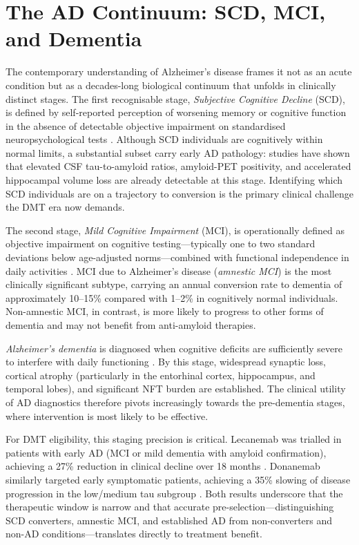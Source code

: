 \documentclass[12pt, a4paper]{report}
\begin{document}
  \section{The AD Continuum: SCD, MCI, and Dementia}
  \label{sec:ad-continuum}

  The contemporary understanding of Alzheimer's disease frames it not as an acute
  condition but as a decades-long biological continuum that unfolds in clinically
  distinct stages. The first recognisable stage, \emph{Subjective Cognitive Decline}
  (SCD), is defined by self-reported perception of worsening memory or cognitive
  function in the absence of detectable objective impairment on standardised
  neuropsychological tests \citep{jessen2014scd}. Although SCD individuals are
  cognitively within normal limits, a substantial subset carry early AD pathology:
  studies have shown that elevated CSF tau-to-amyloid ratios, amyloid-PET positivity,
  and accelerated hippocampal volume loss are already detectable at this stage.
  Identifying which SCD individuals are on a trajectory to conversion is the primary
  clinical challenge the DMT era now demands.

  The second stage, \emph{Mild Cognitive Impairment} (MCI), is operationally defined
  as objective impairment on cognitive testing---typically one to two standard
  deviations below age-adjusted norms---combined with functional independence in daily
  activities \citep{albert2011mci, petersen2004mci}. MCI due to Alzheimer's
  disease (\emph{amnestic MCI}) is the most clinically significant subtype, carrying
  an annual conversion rate to dementia of approximately 10--15\% compared with
  1--2\% in cognitively normal individuals. Non-amnestic MCI, in contrast, is more
  likely to progress to other forms of dementia and may not benefit from
  anti-amyloid therapies.

  \emph{Alzheimer's dementia} is diagnosed when cognitive deficits are sufficiently
  severe to interfere with daily functioning \citep{mckhann2011diagnosis}. By this
  stage, widespread synaptic loss, cortical atrophy (particularly in the entorhinal
  cortex, hippocampus, and temporal lobes), and significant NFT burden are
  established. The clinical utility of AD diagnostics therefore pivots increasingly
  towards the pre-dementia stages, where intervention is most likely to be effective.

  For DMT eligibility, this staging precision is critical. Lecanemab was trialled in
  patients with early AD (MCI or mild dementia with amyloid confirmation), achieving
  a 27\% reduction in clinical decline over 18 months \citep{vandyck2023lecanemab}.
  Donanemab similarly targeted early symptomatic patients, achieving a 35\%
  slowing of disease progression in the low/medium tau subgroup \citep{sims2023donanemab}.
  Both results underscore that the therapeutic window is narrow and that accurate
  pre-selection---distinguishing SCD converters, amnestic MCI, and established
  AD from non-converters and non-AD conditions---translates directly to treatment
  benefit.
\end{document}
